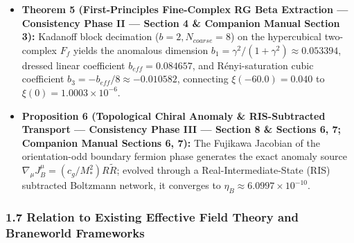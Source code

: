 \documentclass[aps,prd,onecolumn,superscriptaddress,nofootinbib,longbibliography,10pt]{revtex4-2}
\begin{document}
\begin{itemize}
\item \textbf{Theorem 5 (First-Principles Fine-Complex RG Beta Extraction — Consistency Phase II — Section 4 \& Companion Manual Section 3):} Kadanoff block decimation (\(b = 2, N_{coarse} = 8\)) on the hypercubical two-complex \(F_f\) yields the anomalous dimension \(b_1 = \gamma^2/(1+\gamma^2) \approx 0.053394\), dressed linear coefficient \(b_{eff} = 0.084657\), and Rényi-saturation cubic coefficient \(b_3 = -b_{eff}/8 \approx -0.010582\), connecting \(\xi(-60.0) = 0.040\) to \(\xi(0) = 1.0003 \times 10^{-6}\).
    
\item \textbf{Proposition 6 (Topological Chiral Anomaly \& RIS-Subtracted Transport — Consistency Phase III — Section 8 \& Sections 6, 7; Companion Manual Sections 6, 7):} The Fujikawa Jacobian of the orientation-odd boundary fermion phase generates the exact anomaly source \(\nabla_\mu J_B^\mu = (c_g/M_*^2) R\tilde{R}\); evolved through a Real-Intermediate-State (RIS) subtracted Boltzmann network, it converges to \(\eta_B \approx 6.0997 \times 10^{-10}\).
  
\end{itemize}


  
\subsubsection*{1.7 Relation to Existing Effective Field Theory and Braneworld Frameworks}
\end{document}
